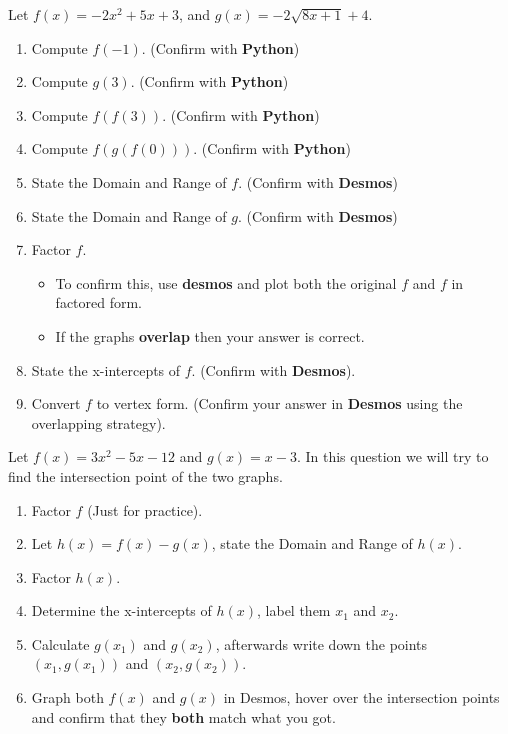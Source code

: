 \documentclass[12pt]{article} %
\begin{document}
\begin{qstn}
  Let $f(x) = -2x^2 + 5x + 3$, and $g(x) = -2\sqrt{8x+1} + 4$.
  \begin{enumerate}[label=(\alph*)]
    \item Compute $f(-1)$. (Confirm with \textbf{Python})
    \item Compute $g(3)$. (Confirm with \textbf{Python})
    \item Compute $f(f(3))$. (Confirm with \textbf{Python})
    \item Compute $f(g(f(0)))$. (Confirm with \textbf{Python})
    \item State the Domain and Range of $f$. (Confirm with \textbf{Desmos})
    \item State the Domain and Range of $g$. (Confirm with \textbf{Desmos})
    \item Factor $f$.
      \begin{itemize}
        \item To confirm this, use \textbf{desmos} and plot both the original $f$ and $f$ in factored form. 
        \item If the graphs \textbf{overlap} then your answer is correct.
      \end{itemize}
    \item State the x-intercepts of $f$. (Confirm with  \textbf{Desmos}).
    \item Convert $f$ to vertex form. (Confirm your answer in \textbf{Desmos} using the overlapping strategy).
  \end{enumerate}
\end{qstn}


\begin{qstn} Let $f(x) = 3x^2 -5x -12$ and $g(x) = x - 3$. In this question we will try to find the intersection point of the two
  graphs.
  \begin{enumerate}[label=(\alph*)]
    \item Factor $f$ (Just for practice). 
    \item Let $h(x) = f(x) - g(x)$, state the Domain and Range of $h(x)$.
    \item Factor $h(x)$.
    \item Determine the x-intercepts of $h(x)$, label them $x_1$ and $x_2$.
    \item Calculate $g(x_1)$ and  $g(x_2)$, afterwards write down the points $(x_1,g(x_1))$ and  $(x_2,g(x_2))$.
    \item Graph both  $f(x)$ and $g(x)$ in Desmos, hover over the intersection points and confirm that they \textbf{both}
      match what you got.
  \end{enumerate}
  
\end{qstn}
\end{document}
